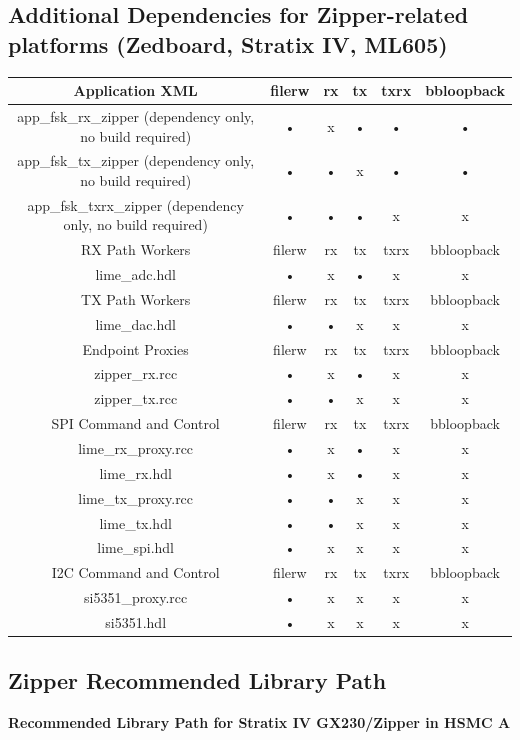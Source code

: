 \subsection{Additional Dependencies for Zipper-related platforms (Zedboard, Stratix IV, ML605)}
	\begin{tabular}{|c|c|c|c|c|c|}
	\hline
	\rowcolor{blue}
	Application XML & filerw & rx & tx & txrx & bbloopback \\
	\hline
	app\_fsk\_rx\_zipper (dependency only, no build required) & • & x & • & • & • \\
	\hline
	app\_fsk\_tx\_zipper (dependency only, no build required) & • & • & x & • & • \\
	\hline
	app\_fsk\_txrx\_zipper (dependency only, no build required) & • & • & • & x & x \\
	\hline
	\rowcolor{blue}
	RX Path Workers & filerw & rx & tx & txrx & bbloopback \\
	\hline
	lime\_adc.hdl & • & x & • & x & x \\
	\hline
	\rowcolor{blue}
	TX Path Workers & filerw & rx & tx & txrx & bbloopback \\
	\hline
	lime\_dac.hdl & • & • & x & x & x \\
	\hline
	\rowcolor{blue}
	Endpoint Proxies & filerw & rx & tx & txrx & bbloopback \\
	\hline
	zipper\_rx.rcc & • & x & • & x & x \\
	\hline
	zipper\_tx.rcc & • & • & x & x & x \\
	\hline
	\rowcolor{blue}
	SPI Command and Control & filerw & rx & tx & txrx & bbloopback \\
	\hline
	lime\_rx\_proxy.rcc & • & x & • & x & x \\
	\hline
	lime\_rx.hdl & • & x & • & x & x \\
	\hline
	lime\_tx\_proxy.rcc & • & • & x & x & x \\
	\hline
	lime\_tx.hdl & • & • & x & x & x \\
	\hline
	lime\_spi.hdl & • & x & x & x & x \\
	\hline
	\rowcolor{blue}
	I2C Command and Control & filerw & rx & tx & txrx & bbloopback \\
	\hline
	si5351\_proxy.rcc & • & x & x & x & x \\
	\hline
	si5351.hdl & • & x & x & x & x \\
	\hline
	\end{tabular}
 
\medskip

\subsection{Zipper Recommended Library Path}
\noindent\textbf{Recommended Library Path for Stratix IV GX230/Zipper in HSMC A}\\

